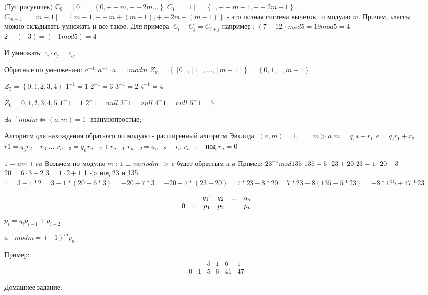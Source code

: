 (Тут рисуночек)
$ С_0  = [0] = \left\lbrace 0, +-m, +- 2m... \right\rbrace $
$ C_1 = [1] = \left\lbrace 1, +-m+1 , +-2m+1 \right\rbrace $
...
$ C_{m-1} = [m-1] = \left\lbrace m-1, +-m+(m-1) , +-2m+(m-1) \right\rbrace $
 - это полная система вычетов по модулю $ m $. Причем, классы можно складывать умножать и все такое.
 Для примера:
 $ C_i + C_j = C_{i+j} $
 например :
 $ (7+12)mod 5 = 19 mod 5 = 4 $
 $ 2+(-3) = (-1 mod 5) = 4 $

И умножать:
 $ c_i \cdot c_j = c_{ij}$
 
 
 Обратные по умножению:
 $ a^{-1}: a^{-1}\cdot a = 1 mod m $
 $ Z_m = \left\lbrace [0], [1], ... ,[m-1]\right\rbrace = \left\lbrace 0, 1, ... ,m-1\right\rbrace  $
 
 $ Z_5 = \left\lbrace 0, 1, 2,3,4\right\rbrace  $
 $ 1^{-1} = 1 $
 $ 2^{-1} = 3 $
 $ 3^{-1} = 2 $
 $ 4^{-1} = 4 $
 
 
 
 $ Z_6 = {0,1,2,3,4,5} $
 $ 1^-1 = 1 $
 $ 2^-1 = null $
 $ 3^-1 = null $
 $ 4^-1 = null $
 $ 5^-1 = 5 $
 
 
$ \exists a^{-1} mod m \Leftrightarrow (a,m)=1$  -взаимнопростые;


Алгоритм для нахождения обратного по модулю - расширенный алгоритм Эвклида.
$ (a,m)=1, \qquad m>a $ 
$ m=q_1 a + r_1 $
$ a = q_2 r_1 + r_2 $
$ r1 = q_3 r_2 + r_3 $
...
$ r_{n-3} = q_n r_{n-2} + {r_{n-1}}$
$ r_{n-2} = a_{n-2} + r_n$
$ r_{n-1} $ - нод
$ r_n = 0 $



$ 1 = um + va $ 
Возьмем по модулю $ m $ :
$ 1 \equiv va mod m $ -> $ v $ будет обратным к $ a $
Пример:
$ 23^{-1} mod 135 $
$ 135 = 5 \cdot 23 + 20 $
$ 23 = 1 \cdot 20 + 3 $
$ 20 = 6 \cdot 3 + 2 $
$ 3 = 1 \cdot 2 + 1 $
1 -> нод 23 и 135.
$ 1  = 3 - 1*2 = 3-1*(20-6*3) = -20 + 7*3 = -20 + 7*(23-20) = 7*23 - 8*20 = 7*23-8(135-5*23) = -8*135 + 47*23 $


\begin{equation}
	\begin{array}{cccccc}
		&  & q_1` & q_2 & ...  & q_n \\ 
		0 & 1 & p_1 & p_2 &  & p_n
	\end{array} 
\end{equation}
$ p_i = q_i p_{i-1} + p_{i-2} $

$ a^{-1}modm = (-1)^m p_n$

Пример: 
\begin{equation}
	\begin{array}{cccccc}
			& 	& 5 & 1 & 6  & 1 \\ 
		0 & 1 & 5 & 6 & 41 & 47
	\end{array} 
\end{equation}

Домашнее задание:

